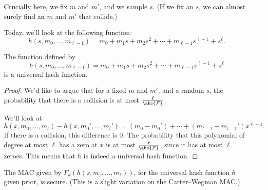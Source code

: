 Crucially here, we fix $m$ and $m'$, and we sample $s$. (If we fix an $s$, we can almost surely find an $m$ and $m'$ that collide.)

Today, we'll look at the following function:
\[
    h(s, m_0, \ldots, m_{\ell - 1}) = m_0 + m_1 s + m_2 s^2 + \cdots + m_{\ell - 1} s^{\ell - 1} + s^{\ell}
.\]

\begin{claim}
    The function defined by
    \[
        h(s, m_0, \ldots, m_{\ell - 1}) = m_0 + m_1 s + m_2 s^2 + \cdots + m_{\ell - 1} s^{\ell - 1} + s^{\ell}
    \]
    is a universal hash function.
\end{claim}

\begin{proof}
    We'd like to argue that for a fixed $m$ and $m'$, and a random $s$, the probability that there is a collision is at most $\frac{\ell}{\abs{\mathcal{F}}}$.

    We'll look at
    \[
        h(x, m_0, \ldots, m_t) - h(x, m_0', \ldots, m_t') = (m_0 - m_0') + \cdots + (m_{t - 1} - m_{t-1}') x^{\ell - 1}
    .\]
    If there is a collision, this difference is 0. The probability that this polynomial of degree at most $\ell$ has a zero at $x$ is at most $\frac{\ell}{\abs{\mathcal{F}}}$, since it has at most $\ell$ zeroes. This means that $h$ is indeed a universal hash function.
\end{proof}

\begin{claim}
    The MAC given by $F_k(h(s, m_1, \ldots, m_{\ell}))$, for the universal hash function $h$ given prior, is secure. (This is a slight variation on the Carter--Wegman MAC.)
\end{claim}

